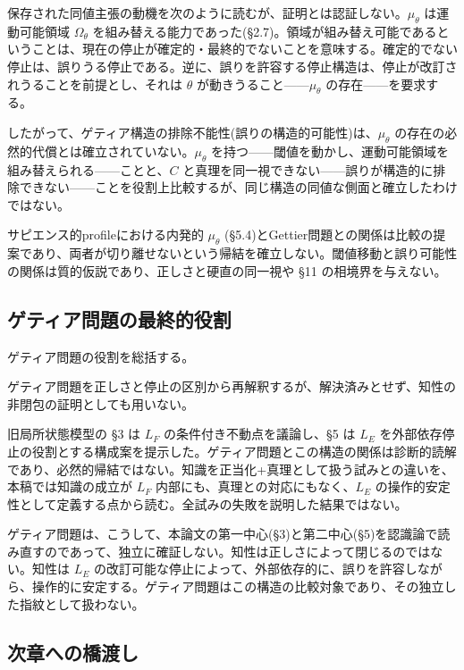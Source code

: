 保存された同値主張の動機を次のように読むが、証明とは認証しない。$\mu_\theta$ は運動可能領域 $\Omega_\theta$ を組み替える能力であった(\S{}2.7)。領域が組み替え可能であるということは、現在の停止が確定的・最終的でないことを意味する。確定的でない停止は、誤りうる停止である。逆に、誤りを許容する停止構造は、停止が改訂されうることを前提とし、それは $\theta$ が動きうること——$\mu_\theta$ の存在——を要求する。

したがって、ゲティア構造の排除不能性(誤りの構造的可能性)は、$\mu_\theta$ の存在の必然的代償とは確立されていない。$\mu_\theta$ を持つ——閾値を動かし、運動可能領域を組み替えられる——ことと、$C$ と真理を同一視できない——誤りが構造的に排除できない——ことを役割上比較するが、同じ構造の同値な側面と確立したわけではない。

サピエンス的profileにおける内発的 $\mu_\theta$ (\S{}5.4)とGettier問題との関係は比較の提案であり、両者が切り離せないという帰結を確立しない。閾値移動と誤り可能性の関係は質的仮説であり、正しさと硬直の同一視や \S{}11 の相境界を与えない。

\bigskip


\subsection{ゲティア問題の最終的役割}


ゲティア問題の役割を総括する。

ゲティア問題を正しさと停止の区別から再解釈するが、解決済みとせず、知性の非閉包の証明としても用いない。

旧局所状態模型の \S{}3 は $L_F$ の条件付き不動点を議論し、\S{}5 は $L_E$ を外部依存停止の役割とする構成案を提示した。ゲティア問題とこの構造の関係は診断的読解であり、必然的帰結ではない。知識を正当化+真理として扱う試みとの違いを、本稿では知識の成立が $L_F$ 内部にも、真理との対応にもなく、$L_E$ の操作的安定性として定義する点から読む。全試みの失敗を説明した結果ではない。

ゲティア問題は、こうして、本論文の第一中心(\S{}3)と第二中心(\S{}5)を認識論で読み直すのであって、独立に確証しない。知性は正しさによって閉じるのではない。知性は $L_E$ の改訂可能な停止によって、外部依存的に、誤りを許容しながら、操作的に安定する。ゲティア問題はこの構造の比較対象であり、その独立した指紋として扱わない。

\bigskip


\subsection{次章への橋渡し}


